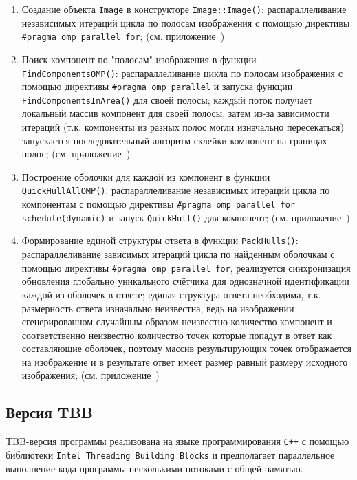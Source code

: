 \documentclass[12pt]{article}
\begin{document}
\begin{enumerate}
    \item Создание объекта \texttt{Image} в конструкторе \texttt{Image::Image()}: распараллеливание независимых итераций цикла по полосам изображения с помощью директивы \texttt{\#pragma omp parallel for}; (см. приложение~)
    \item Поиск компонент по "полосам" изображения в функции \texttt{FindComponentsOMP()}: распараллеливание цикла по полосам изображения с помощью директивы \texttt{\#pragma omp parallel} и запуска функции \texttt{FindComponentsInArea()} для своей полосы; каждый поток получает локальный массив компонент для своей полосы, затем из-за зависимости итераций (т.к. компоненты из разных полос могли изначально пересекаться) запускается последовательный алгоритм склейки компонент на границах полос; (см. приложение~)
    \item Построение оболочки для каждой из компонент в функции \texttt{QuickHullAllOMP()}: распараллеливание независимых итераций цикла по компонентам с помощью директивы \texttt{\#pragma omp parallel for schedule(dynamic)} и запуск \texttt{QuickHull()} для компонент; (см. приложение~)
    \item Формирование единой структуры ответа в функции \texttt{PackHulls()}: распараллеливание зависимых итераций цикла по найденным оболочкам с помощью директивы \texttt{\#pragma omp parallel for}, реализуется синхронизация обновления глобально уникального счётчика для однозначной идентификации каждой из оболочек в ответе; единая структура ответа необходима, т.к. размерность ответа изначально неизвестна, ведь на изображении сгенерированном случайным образом неизвестно количество компонент и соответственно неизвестно количество точек которые попадут в ответ как составляющие оболочек, поэтому массив результирующих точек отображается на изображение и в результате ответ имеет размер равный размеру исходного изображения; (см. приложение~)
\end{enumerate}

\newpage

\subsection{Версия TBB}

TBB-версия программы реализована на языке программирования \texttt{C++} с помощью библиотеки \texttt{Intel Threading Building Blocks} и предполагает параллельное выполнение кода программы несколькими потоками с общей памятью.
\end{document}
